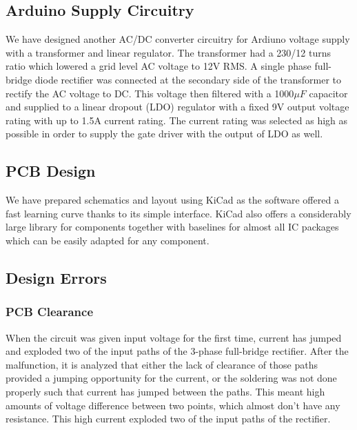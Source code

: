 \documentclass[12pt]{article}
\begin{document}
\subsection{Arduino Supply Circuitry}
We have designed another AC/DC converter circuitry for Ardiuno voltage supply with a transformer and linear regulator. The transformer had a 230/12 turns ratio which lowered a grid level AC voltage to 12V RMS. A single phase full-bridge diode rectifier was connected at the secondary side of the transformer to rectify the AC voltage to DC. This voltage then filtered with a 1000\begin{math} \mu F \end{math} capacitor and supplied to a linear dropout (LDO) regulator with a fixed 9V output voltage rating with up to 1.5A current rating. The current rating was selected as high as possible in order to supply the gate driver with the output of LDO as well.
\subsection{PCB Design}
We have prepared schematics and layout using KiCad as the software offered a fast learning curve thanks to its simple interface. KiCad also offers a considerably large library for components together with baselines for almost all IC packages which can be easily adapted for any component. \\
\subsection{Design Errors}
\subsubsection{PCB Clearance}
When the circuit was given input voltage for the first time, current has jumped and exploded two of the input paths of the 3-phase full-bridge rectifier. After the malfunction, it is analyzed that either the lack of clearance of those paths provided a jumping opportunity for the current, or the soldering was not done properly such that current has jumped between the paths. This meant high amounts of voltage difference between two points, which almost don’t have any resistance. This high current exploded two of the input paths of the rectifier.
\end{document}
